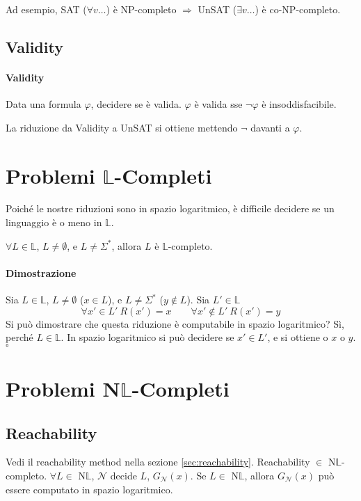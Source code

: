 Ad esempio, SAT ($\forall v\dots$) è NP-completo $\Rightarrow$ UnSAT ($\exists v\dots$) è co-NP-completo.


\subsection{Validity}
\paragraph{Validity} Data una formula $\varphi$, decidere se è valida. $\varphi$ è valida sse $\lnot\varphi$ è insoddisfacibile.\medskip 

La riduzione da Validity a UnSAT si ottiene mettendo $\neg$ davanti a $\varphi$. 





\section{Problemi $\mathbb{L}$-Completi}
Poiché le nostre riduzioni sono in spazio logaritmico, è difficile decidere se un linguaggio è o meno in $\mathbb{L}$. 

\begin{theorem}
    $\forall L\in\mathbb{L}$, $L\neq\emptyset$, e $L\neq\Sigma^*$, allora $L$ è $\mathbb{L}$-completo.
\end{theorem}

\paragraph{Dimostrazione} Sia $L\in\mathbb{L}$, $L\neq\emptyset$ ($x\in L$), e $L\neq\Sigma^*$ ($y\not\in L$). Sia $L'\in\mathbb{L}$
$$
    \forall x'\in L' ~ R(x')=x 
    \qquad 
    \forall x'\not\in L' ~ R(x')=y
$$
Si può dimostrare che questa riduzione è computabile in spazio logaritmico? Sì, perché $L\in\mathbb{L}$. In spa\-zio logaritmico si può decidere se $x'\in L'$, e si ottiene o $x$ o $y$.\hfill$\square$




\section{Problemi N$\mathbb{L}$-Completi}

\subsection{Reachability}
Vedi il reachability method nella sezione \vref{sec:reachability}. Reachability $\in$ N$\mathbb{L}$-completo. $\forall L\in$ N$\mathbb{L}$, $\mathcal{N}$ decide $L$, $G_\mathcal{N}(x)$. Se $L\in$ N$\mathbb{L}$, allora $G_\mathcal{N}(x)$ può essere computato in spazio logaritmico.


